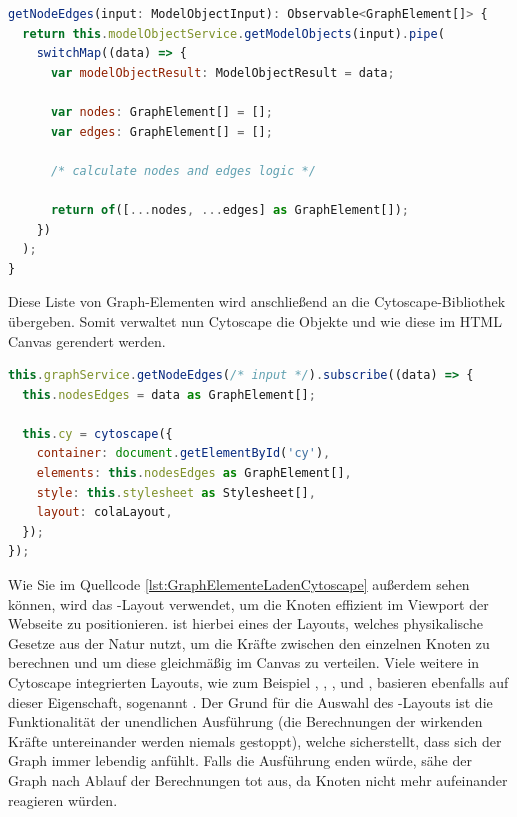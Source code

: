 \begin{lstlisting}[language={JavaScript},caption={Erstellen der Knoten und Kanten mittels Liste von Objekten von GraphQL},label={lst:AufbereitungKnotenKantenGraphQLCytoscape},captionpos=b]
getNodeEdges(input: ModelObjectInput): Observable<GraphElement[]> {
  return this.modelObjectService.getModelObjects(input).pipe(
    switchMap((data) => {
      var modelObjectResult: ModelObjectResult = data;

      var nodes: GraphElement[] = [];
      var edges: GraphElement[] = [];

      /* calculate nodes and edges logic */

      return of([...nodes, ...edges] as GraphElement[]);
    })
  );
}
\end{lstlisting}

Diese Liste von Graph-Elementen wird anschließend an die Cytoscape-Bibliothek übergeben. Somit verwaltet nun Cytoscape die Objekte und wie diese im HTML Canvas gerendert werden.

\begin{lstlisting}[language={JavaScript},caption={Laden der Knoten und Kanten in den Graphen mittels Cytoscape},label={lst:GraphElementeLadenCytoscape},captionpos=b]
this.graphService.getNodeEdges(/* input */).subscribe((data) => {
  this.nodesEdges = data as GraphElement[];

  this.cy = cytoscape({
    container: document.getElementById('cy'),
    elements: this.nodesEdges as GraphElement[],
    style: this.stylesheet as Stylesheet[],
    layout: colaLayout,
  });
});
\end{lstlisting}

Wie Sie im Quellcode \ref{lst:GraphElementeLadenCytoscape} außerdem sehen können, wird das -Layout verwendet, um die Knoten effizient im Viewport der Webseite zu positionieren.  ist hierbei eines der Layouts, welches physikalische Gesetze aus der Natur nutzt, um die Kräfte zwischen den einzelnen Knoten zu berechnen und um diese gleichmäßig im Canvas zu verteilen. Viele weitere in Cytoscape integrierten Layouts, wie zum Beispiel , , ,  und , basieren ebenfalls auf dieser Eigenschaft, sogenannt . Der Grund für die Auswahl des -Layouts ist die Funktionalität der unendlichen Ausführung (die Berechnungen der wirkenden Kräfte untereinander werden niemals gestoppt), welche sicherstellt, dass sich der Graph immer lebendig anfühlt. Falls die Ausführung enden würde, sähe der Graph nach Ablauf der Berechnungen tot aus, da Knoten nicht mehr aufeinander reagieren würden.